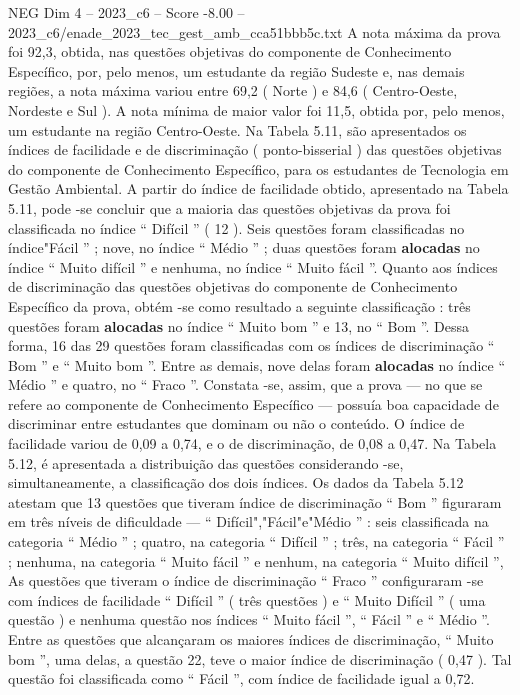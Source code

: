 \begin{textsample}{NEG Dim 4 – 2023\_c6 – Score -8.00 – 2023\_c6/enade\_2023\_tec\_gest\_amb\_cca51bbb5c.txt}
A nota máxima da prova foi 92,3, obtida, nas questões objetivas do componente de Conhecimento Específico, por, pelo menos, um estudante da região Sudeste e, nas demais regiões, a nota máxima variou entre 69,2 ( Norte ) e 84,6 ( Centro-Oeste, Nordeste e Sul ).
A nota mínima de maior valor foi 11,5, obtida por, pelo menos, um estudante na região Centro-Oeste.
Na Tabela 5.11, são apresentados os índices de facilidade e de discriminação ( ponto-bisserial ) das questões objetivas do componente de Conhecimento Específico, para os estudantes de Tecnologia em Gestão Ambiental.
A partir do índice de facilidade obtido, apresentado na Tabela 5.11, pode -se concluir que a maioria das questões objetivas da prova foi classificada no índice “ Difícil ” ( 12 ).
Seis questões foram classificadas no índice"Fácil ” ; nove, no índice “ Médio ” ; duas questões foram \textbf{alocadas} no índice “ Muito difícil ” e nenhuma, no índice “ Muito fácil ”.
Quanto aos índices de discriminação das questões objetivas do componente de Conhecimento Específico da prova, obtém -se como resultado a seguinte classificação : três questões foram \textbf{alocadas} no índice “ Muito bom ” e 13, no “ Bom ”.
Dessa forma, 16 das 29 questões foram classificadas com os índices de discriminação “ Bom ” e “ Muito bom ”.
Entre as demais, nove delas foram \textbf{alocadas} no índice “ Médio ” e quatro, no “ Fraco ”.
Constata -se, assim, que a prova — no que se refere ao componente de Conhecimento Específico — possuía boa capacidade de discriminar entre estudantes que dominam ou não o conteúdo.
O índice de facilidade variou de 0,09 a 0,74, e o de discriminação, de 0,08 a 0,47.
Na Tabela 5.12, é apresentada a distribuição das questões considerando -se, simultaneamente, a classificação dos dois índices.
Os dados da Tabela 5.12 atestam que 13 questões que tiveram índice de discriminação “ Bom ” figuraram em três níveis de dificuldade — “ Difícil","Fácil"e"Médio ” : seis classificada na categoria “ Médio ” ; quatro, na categoria “ Difícil ” ; três, na categoria “ Fácil ” ; nenhuma, na categoria “ Muito fácil ” e nenhum, na categoria “ Muito difícil ”, As questões que tiveram o índice de discriminação “ Fraco ” configuraram -se com índices de facilidade “ Difícil ” ( três questões ) e “ Muito Difícil ” ( uma questão ) e nenhuma questão nos índices “ Muito fácil ”, “ Fácil ” e “ Médio ”.
Entre as questões que alcançaram os maiores índices de discriminação, “ Muito bom ”, uma delas, a questão 22, teve o maior índice de discriminação ( 0,47 ).
Tal questão foi classificada como “ Fácil ”, com índice de facilidade igual a 0,72.

\end{textsample}
